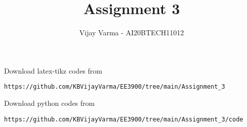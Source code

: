 \documentclass[journal,12pt,twocolumn]{IEEEtran}
\DeclareMathOperator*{\Res}{Res}
\begin{document}
\newcommand{\BEQA}{\begin{eqnarray}}
\newcommand{\EEQA}{\end{eqnarray}}
\newcommand{\define}{\stackrel{\triangle}{=}}

\raggedbottom
\setlength{\parindent}{0pt}
\providecommand{\mbf}{\mathbf}
\providecommand{\pr}[1]{\ensuremath{\Pr\left(#1\right)}}
\providecommand{\qfunc}[1]{\ensuremath{Q\left(#1\right)}}
\providecommand{\sbrak}[1]{\ensuremath{{}\left[#1\right]}}
\providecommand{\lsbrak}[1]{\ensuremath{{}\left[#1\right.}}
\providecommand{\rsbrak}[1]{\ensuremath{{}\left.#1\right]}}
\providecommand{\brak}[1]{\ensuremath{\left(#1\right)}}
\providecommand{\lbrak}[1]{\ensuremath{\left(#1\right.}}
\providecommand{\rbrak}[1]{\ensuremath{\left.#1\right)}}
\providecommand{\cbrak}[1]{\ensuremath{\left\{#1\right\}}}
\providecommand{\lcbrak}[1]{\ensuremath{\left\{#1\right.}}
\providecommand{\rcbrak}[1]{\ensuremath{\left.#1\right\}}}
\theoremstyle{remark}
\newtheorem{rem}{Remark}
\newcommand{\sgn}{\mathop{\mathrm{sgn}}}
\providecommand{\abs}[1]{\vert#1\vert}
\providecommand{\res}[1]{\Res\displaylimits_{#1}} 
\providecommand{\norm}[1]{\lVert#1\rVert}
\providecommand{\mtx}[1]{\mathbf{#1}}
\providecommand{\mean}[1]{E[ #1 ]}
\providecommand{\fourier}{\overset{\mathcal{F}}{ \rightleftharpoons}}
\providecommand{\system}{\overset{\mathcal{H}}{ \longleftrightarrow}}
\newcommand{\solution}{\noindent \textbf{Solution: }}
\newcommand{\cosec}{\,\text{cosec}\,}
\providecommand{\dec}[2]{\ensuremath{\overset{#1}{\underset{#2}{\gtrless}}}}
\newcommand{\myvec}[1]{\ensuremath{\begin{pmatrix}#1\end{pmatrix}}}
\newcommand{\mydet}[1]{\ensuremath{\begin{vmatrix}#1\end{vmatrix}}}
\makeatletter
{}
\makeatother
\let\StandardTheFigure\thefigure
\let\vec\mathbf
\renewcommand{\thefigure}{\theproblem}
\def\putbox#1#2#3{\makebox[0in][l]{\makebox[#1][l]{}\raisebox{\baselineskip}[0in][0in]{\raisebox{#2}[0in][0in]{#3}}}}
     \def\rightbox#1{\makebox[0in][r]{#1}}
     \def\centbox#1{\makebox[0in]{#1}}
     \def\topbox#1{\raisebox{-\baselineskip}[0in][0in]{#1}}
     \def\midbox#1{\raisebox{-0.5\baselineskip}[0in][0in]{#1}}
\vspace{3cm}
\title{Assignment 3}
\author{Vijay Varma - AI20BTECH11012}
\maketitle
\newpage
\bigskip
\renewcommand{\thefigure}{\theenumi}
\renewcommand{\thetable}{\theenumi}
%
Download latex-tikz codes from 
%
\begin{lstlisting}
https://github.com/KBVijayVarma/EE3900/tree/main/Assignment_3
\end{lstlisting}
%
Download python codes from 
%
\begin{lstlisting}
https://github.com/KBVijayVarma/EE3900/tree/main/Assignment_3/code
\end{lstlisting}
\end{document}
